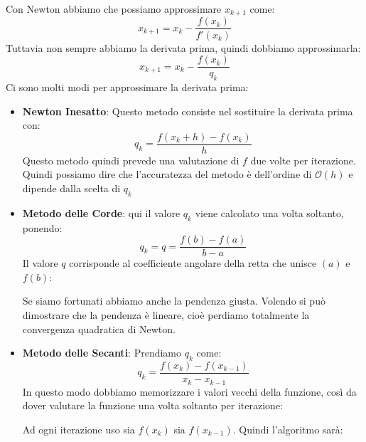 \documentclass[11pt,a4paper,twoside]{article}
\theoremstyle{definition}
\begin{document}
Con Newton abbiamo che possiamo approssimare $x_{k+1}$ come:
\[ x_{k+1} = x_k - \frac{f(x_k)}{f'(x_k)}\]
Tuttavia non sempre abbiamo la derivata prima, quindi dobbiamo approssimarla:
\[ x_{k+1} = x_k -\frac{f(x_k)}{q_k} \]
Ci sono molti modi per approssimare la derivata prima:
\begin{itemize}
	\item \textbf{Newton Inesatto}: Questo metodo consiste nel sostituire la derivata prima con:
		\[ q_k = \frac{f(x_k + h) - f(x_k)}{h} \]
		Questo metodo quindi prevede una valutazione di $f$ due volte per iterazione. Quindi possiamo dire che l'accuratezza del metodo è dell'ordine di $\mathcal O(h)$ e dipende dalla scelta di $q_k$
	\item \textbf{Metodo delle Corde}: qui il valore $q_k$ viene calcolato una volta soltanto, ponendo:
		\[ q_k = q = \frac{f(b) - f(a)}{b-a} \]
		Il valore $q$ corrisponde al coefficiente angolare della retta che unisce $(a)$ e $f(b)$:
		\begin{center}
		\end{center}
		Se siamo fortunati abbiamo anche la pendenza giusta. Volendo si può dimostrare che la pendenza è lineare, cioè perdiamo totalmente la convergenza quadratica di Newton.
	\item \textbf{Metodo delle Secanti}: Prendiamo $q_k$ come:
		\[ q_k = \frac{f(x_k) - f(x_{k-1})}{x_k - x_{k-1}} \]
		In questo modo dobbiamo memorizzare i valori vecchi della funzione, così da dover valutare la funzione una volta soltanto per iterazione:
		\begin{center}
		\end{center}
		Ad ogni iterazione uso sia $f(x_k)$ sia $f(x_{k-1})$. Quindi l'algoritmo sarà:


\end{itemize}
\end{document}
